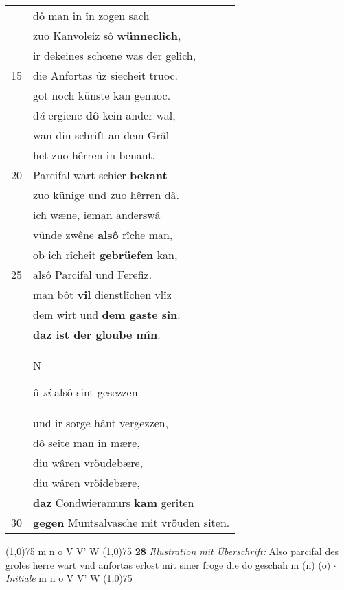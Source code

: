 \documentclass[8pt,a4paper,notitlepage]{article}
\begin{document}
\begin{table}[ht]
\begin{minipage}[t]{0.5\linewidth}
\begin{tabular}{rl}
 & dô man in în zogen sach\\ 
 & zuo Kanvoleiz sô \textbf{wünneclîch},\\ 
 & ir dekeines schœne was der gelîch,\\ 
15 & die Anfortas ûz siecheit truoc.\\ 
 & got noch künste kan genuoc.\\ 
 & d\textit{â} ergienc \textbf{dô} kein ander wal,\\ 
 & wan diu schrift an dem Grâl\\ 
 & het zuo hêrren in benant.\\ 
20 & Parcifal wart schier \textbf{bekant}\\ 
 & zuo künige und zuo hêrren dâ.\\ 
 & ich wæne, ieman anderswâ\\ 
 & vünde zwêne \textbf{alsô} rîche man,\\ 
 & ob ich rîcheit \textbf{gebrüefen} kan,\\ 
25 & alsô Parcifal und Ferefiz.\\ 
 & man bôt \textbf{vil} dienstlîchen vlîz\\ 
 & dem wirt und \textbf{dem gaste sîn}.\\ 
 & \textbf{daz ist der gloube mîn}.\\ 
 & \begin{large}N\end{large}û \textit{si} alsô sint gesezzen\\ 
 & und ir sorge hânt vergezzen,\\ 
 & dô seite man in mære,\\ 
 & diu wâren vröudebære,\\ 
 & diu wâren vröidebære,\\ 
 & \textbf{daz} Condwieramurs \textbf{kam} geriten\\ 
30 & \textbf{gegen} Muntsalvasche mit vröuden siten.\\ 
\end{tabular}
\scriptsize
\line(1,0){75} \newline
m n o V V' W \newline
\line(1,0){75} \newline
\textbf{28} \textit{Illustration mit Überschrift:} Also parcifal des groles herre wart vnd anfortas erlost mit siner froge die do geschah m (n) (o)   $\cdot$ \textit{Initiale} m n o V V' W  \newline
\line(1,0){75} \newline

\end{minipage}
\end{table}
\end{document}
